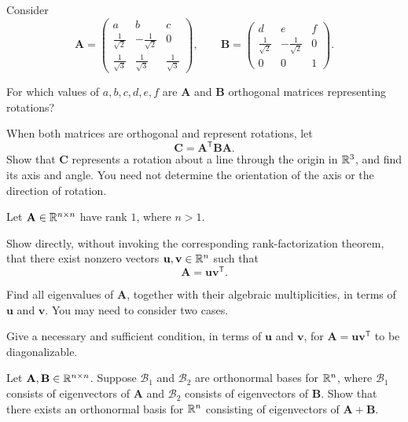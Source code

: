 \documentclass[11pt,oneside]{article}
\begin{document}
\begin{problem}
Consider
\[
\mathbf A=
\begin{pmatrix}
a&b&c\\
\frac1{\sqrt2}&-\frac1{\sqrt2}&0\\
\frac1{\sqrt3}&\frac1{\sqrt3}&\frac1{\sqrt3}
\end{pmatrix},
\qquad
\mathbf B=
\begin{pmatrix}
d&e&f\\
\frac1{\sqrt2}&-\frac1{\sqrt2}&0\\
0&0&1
\end{pmatrix}.
\]
\begin{problemsubparts}
\item For which values of $a,b,c,d,e,f$ are $\mathbf A$ and $\mathbf B$ orthogonal matrices representing rotations?
\item When both matrices are orthogonal and represent rotations, let
\[
\mathbf C=\mathbf A^{\mathsf T}\mathbf B\mathbf A.
\]
Show that $\mathbf C$ represents a rotation about a line through the origin in $\mathbb{R}^3$, and find its axis and angle. You need not determine the orientation of the axis or the direction of rotation.
\end{problemsubparts}
\end{problem}

\begin{problem}
Let $\mathbf A\in\mathbb{R}^{n\times n}$ have rank $1$, where $n>1$.
\begin{problemsubparts}
\item Show directly, without invoking the corresponding rank-factorization theorem, that there exist nonzero vectors $\mathbf u,\mathbf v\in\mathbb{R}^n$ such that
\[
\mathbf A=\mathbf u\mathbf v^{\mathsf T}.
\]
\item Find all eigenvalues of $\mathbf A$, together with their algebraic multiplicities, in terms of $\mathbf u$ and $\mathbf v$. You may need to consider two cases.
\item Give a necessary and sufficient condition, in terms of $\mathbf u$ and $\mathbf v$, for $\mathbf A=\mathbf u\mathbf v^{\mathsf T}$ to be diagonalizable.
\end{problemsubparts}
\end{problem}

\begin{problem}
Let $\mathbf A,\mathbf B\in\mathbb{R}^{n\times n}$. Suppose $\mathcal B_1$ and $\mathcal B_2$ are orthonormal bases for $\mathbb{R}^n$, where $\mathcal B_1$ consists of eigenvectors of $\mathbf A$ and $\mathcal B_2$ consists of eigenvectors of $\mathbf B$. Show that there exists an orthonormal basis for $\mathbb{R}^n$ consisting of eigenvectors of $\mathbf A+\mathbf B$.
\end{problem}
\end{document}
